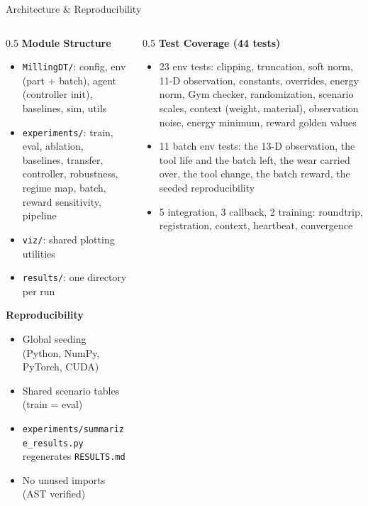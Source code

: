 \documentclass[11pt,aspectratio=169]{beamer}
\begin{document}
\begin{frame}{Architecture \& Reproducibility}
    \footnotesize
    \begin{columns}[T]
        \begin{column}{0.5\textwidth}
            \textbf{Module Structure}
            \begin{itemize}
                \item \texttt{MillingDT/}: config, env (part + batch), agent (controller init), baselines, sim, utils
                \item \texttt{experiments/}: train, eval, ablation, baselines, transfer, controller, robustness, regime map, batch, reward sensitivity, pipeline
                \item \texttt{viz/}: shared plotting utilities
                \item \texttt{results/}: one directory per run
            \end{itemize}

            \textbf{Reproducibility}
            \begin{itemize}
                \item Global seeding (Python, NumPy, PyTorch, CUDA)
                \item Shared scenario tables (train = eval)
                \item \texttt{experiments/summarize\_results.py} regenerates \texttt{RESULTS.md}
                \item No unused imports (AST verified)
            \end{itemize}
        \end{column}
        \begin{column}{0.5\textwidth}
            \textbf{Test Coverage (44 tests)}
            \begin{itemize}
                \item 23 env tests: clipping, truncation, soft norm, 11-D observation, constants, overrides, energy norm, Gym checker, randomization, scenario scales, context (weight, material), observation noise, energy minimum, reward golden values
                \item 11 batch env tests: the 13-D observation, the tool life and the batch left, the wear carried over, the tool change, the batch reward, the seeded reproducibility
                \item 5 integration, 3 callback, 2 training: roundtrip, registration, context, heartbeat, convergence
            \end{itemize}
        \end{column}
    \end{columns}
\end{frame}
\end{document}
